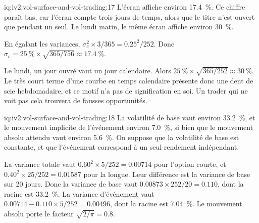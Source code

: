 \begin{solution}{iq:iv2:vol-surface-and-vol-trading:17}
L'écran affiche environ 17.4~\%. Ce chiffre paraît bas, car l'écran compte trois jours de temps, alors que le titre n'est ouvert que pendant un seul. Le lundi matin, le même écran affiche environ 30~\%.

En égalant les variances, $\sigma_c^2 \times 3/365 = 0.25^2/252$. Donc $\sigma_c = 25~\% \times \sqrt{365/756} \approx 17.4~\%$.

Le lundi, un jour ouvré vaut un jour calendaire. Alors $25~\% \times \sqrt{365/252} \approx 30~\%$. Le très court terme d'une courbe en temps calendaire présente donc une dent de scie hebdomadaire, et ce motif n'a pas de signification en soi. Un trader qui ne voit pas cela trouvera de fausses opportunités.

\end{solution}

\begin{solution}{iq:iv2:vol-surface-and-vol-trading:18}
La volatilité de base vaut environ 33.2~\%, et le mouvement implicite de l'événement environ 7.0~\%, si bien que le mouvement absolu attendu vaut environ 5.6~\%. On suppose que la volatilité de base est constante, et que l'événement correspond à un seul rendement indépendant.

La variance totale vaut $0.60^2 \times 5/252 = 0.00714$ pour l'option courte, et $0.40^2 \times 25/252 = 0.01587$ pour la longue. Leur différence est la variance de base sur 20 jours. Donc la variance de base vaut $0.00873 \times 252/20 = 0.110$, dont la racine est 33.2~\%. La variance d'événement vaut $0.00714 - 0.110 \times 5/252 = 0.00496$, dont la racine est 7.04~\%. Le mouvement absolu porte le facteur $\sqrt{2/\pi} = 0.8$.

\end{solution}

